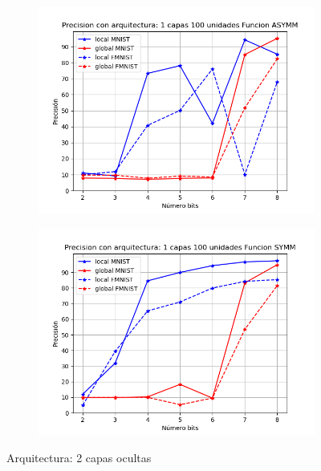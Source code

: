 \begin{figure}[H]
\begin{subfigure}[H]{0.475\textwidth}
    \includegraphics[width=\textwidth]{imagenes/backprop/Precision con arquitectura: 1 capas 100 unidades Funcion ASYMM.png}
    \end{subfigure}
    \begin{subfigure}[H]{0.475\textwidth}
    \includegraphics[width=\textwidth]{imagenes/backprop/Precision con arquitectura: 1 capas 100 unidades Funcion SYMM.png}
    \end{subfigure}
    \caption{Arquitectura: 2 capas ocultas}
\end{figure}

